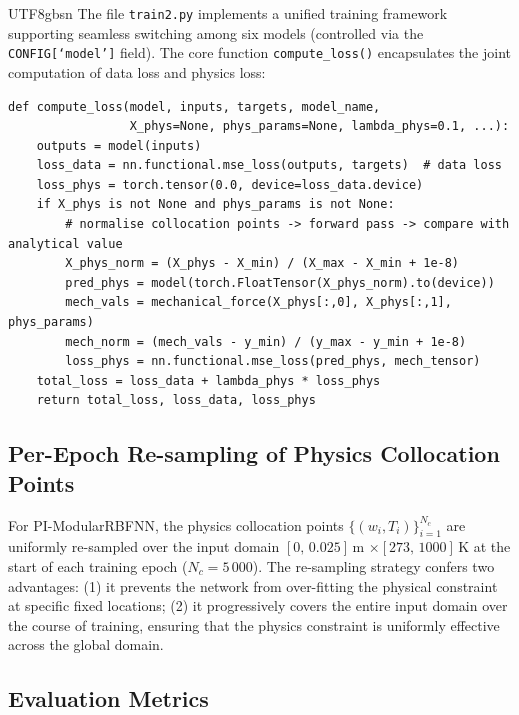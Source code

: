 \documentclass[a4paper,12pt]{report}
\begin{document}
\begin{CJK}{UTF8}{gbsn}
The file \texttt{train2.py} implements a unified training framework supporting seamless
switching among six models (controlled via the \texttt{CONFIG[`model']} field). The core
function \texttt{compute\_loss()} encapsulates the joint computation of data loss and
physics loss:

\begin{lstlisting}[caption={Joint loss computation (\texttt{train2.py} excerpt, simplified excerpt)}, label=lst:compute_loss]
def compute_loss(model, inputs, targets, model_name,
                 X_phys=None, phys_params=None, lambda_phys=0.1, ...):
    outputs = model(inputs)
    loss_data = nn.functional.mse_loss(outputs, targets)  # data loss
    loss_phys = torch.tensor(0.0, device=loss_data.device)
    if X_phys is not None and phys_params is not None:
        # normalise collocation points -> forward pass -> compare with analytical value
        X_phys_norm = (X_phys - X_min) / (X_max - X_min + 1e-8)
        pred_phys = model(torch.FloatTensor(X_phys_norm).to(device))
        mech_vals = mechanical_force(X_phys[:,0], X_phys[:,1], phys_params)
        mech_norm = (mech_vals - y_min) / (y_max - y_min + 1e-8)
        loss_phys = nn.functional.mse_loss(pred_phys, mech_tensor)
    total_loss = loss_data + lambda_phys * loss_phys
    return total_loss, loss_data, loss_phys
\end{lstlisting}

\subsection{Per-Epoch Re-sampling of Physics Collocation Points}
\label{subsec:resampling}

For PI-ModularRBFNN, the physics collocation points $\{(w_i, T_i)\}_{i=1}^{N_c}$ are
uniformly re-sampled over the input domain $[0,\,0.025]$\,m $\times [273,\,1000]$\,K at
the start of each training epoch ($N_c = 5\,000$). The re-sampling strategy confers two
advantages: (1) it prevents the network from over-fitting the physical constraint at
specific fixed locations; (2) it progressively covers the entire input domain over the
course of training, ensuring that the physics constraint is uniformly effective across
the global domain.

\subsection{Evaluation Metrics}
\label{subsec:metrics}


\end{CJK}
\end{document}
